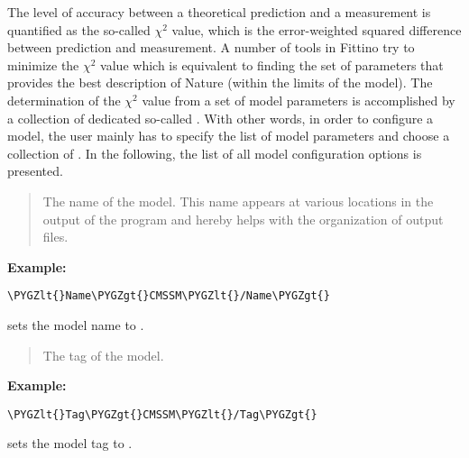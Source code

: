 \documentclass[letterpaper,10pt,english]{sphinxmanual}
\def\PYGZlt{\char`\<}
\def\PYGZgt{\char`\>}
\begin{document}
The level of accuracy between a theoretical prediction and a measurement is quantified as the
so-called \(\chi^2\) value, which is the error-weighted squared difference between prediction
and measurement. A number of tools in Fittino try to minimize the \(\chi^2\) value which is
equivalent to finding the set of parameters that provides the best description of Nature (within the
limits of the model). The determination of the \(\chi^2\) value from a set of model parameters
is accomplished by a collection of dedicated so-called . With other words, in order
to configure a model, the user mainly has to specify the list of model parameters and choose a
collection of . In the following, the list of all model configuration options is
presented.

\begin{quote}

The name of the model. This name appears at various locations in the output of the program and
hereby helps with the organization of output files.
\end{quote}

\textbf{Example:}

\begin{Verbatim}[commandchars=\\\{\}]
\PYGZlt{}Name\PYGZgt{}CMSSM\PYGZlt{}/Name\PYGZgt{}
\end{Verbatim}

sets the model name to .

\begin{quote}

The tag of the model.
\end{quote}

\textbf{Example:}

\begin{Verbatim}[commandchars=\\\{\}]
\PYGZlt{}Tag\PYGZgt{}CMSSM\PYGZlt{}/Tag\PYGZgt{}
\end{Verbatim}

sets the model tag to .
\end{document}
